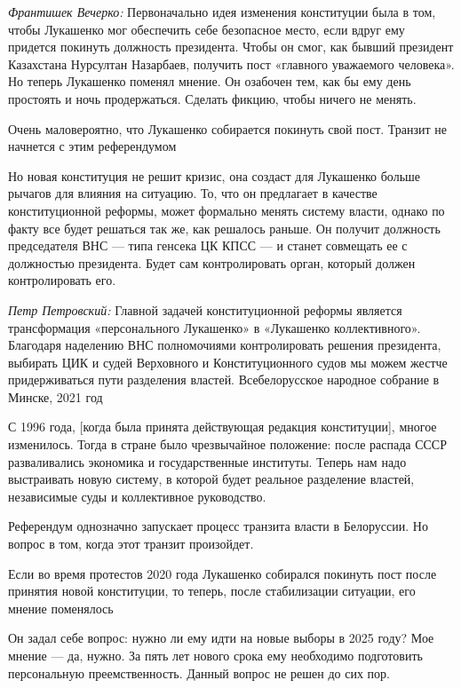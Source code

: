 \textit{Франтишек Вечерко:} Первоначально идея изменения конституции была в том, чтобы Лукашенко мог обеспечить себе безопасное место, если вдруг ему придется покинуть должность президента. Чтобы он смог, как бывший президент Казахстана Нурсултан Назарбаев, получить пост «главного уважаемого человека». Но теперь Лукашенко поменял мнение. Он озабочен тем, как бы ему день простоять и ночь продержаться. Сделать фикцию, чтобы ничего не менять.

\begin{fancyquotes}
    Очень маловероятно, что Лукашенко собирается покинуть свой пост. Транзит не начнется с этим референдумом
\end{fancyquotes}

Но новая конституция не решит кризис, она создаст для Лукашенко больше рычагов для влияния на ситуацию. То, что он предлагает в качестве конституционной реформы, может формально менять систему власти, однако по факту все будет решаться так же, как решалось раньше. Он получит должность председателя ВНС — типа генсека ЦК КПСС — и станет совмещать ее с должностью президента. Будет сам контролировать орган, который должен контролировать его.



\textit{Петр Петровский:} Главной задачей конституционной реформы является трансформация «персонального Лукашенко» в «Лукашенко коллективного». Благодаря наделению ВНС полномочиями контролировать решения президента, выбирать ЦИК и судей Верховного и Конституционного судов мы можем жестче придерживаться пути разделения властей.
Всебелорусское народное собрание в Минске, 2021 год

С 1996 года, [когда была принята действующая редакция конституции], многое изменилось. Тогда в стране было чрезвычайное положение: после распада СССР разваливались экономика и государственные институты. Теперь нам надо выстраивать новую систему, в которой будет реальное разделение властей, независимые суды и коллективное руководство.

Референдум однозначно запускает процесс транзита власти в Белоруссии. Но вопрос в том, когда этот транзит произойдет.


\begin{fancyquotes}
    Если во время протестов 2020 года Лукашенко собирался покинуть пост после принятия новой конституции, то теперь, после стабилизации ситуации, его мнение поменялось
\end{fancyquotes}

Он задал себе вопрос: нужно ли ему идти на новые выборы в 2025 году? Мое мнение — да, нужно. За пять лет нового срока ему необходимо подготовить персональную преемственность. Данный вопрос не решен до сих пор.


